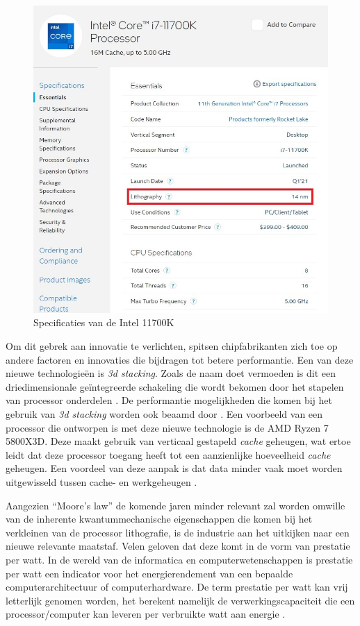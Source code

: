\begin{figure}[!htb]
    \centering
    \includegraphics[width=\linewidth]{img/11700k.jpg}
    \caption{Specificaties van de Intel 11700K \autocite{Intel2021}}
\end{figure}

Om dit gebrek aan innovatie te verlichten, spitsen chipfabrikanten zich toe op andere 
factoren en innovaties die bijdragen tot betere performantie. Een van deze nieuwe technologieën is \textit{3d stacking}. Zoals de naam doet vermoeden is dit een driedimensionale geïntegreerde schakeling die wordt bekomen door het stapelen van processor onderdelen \autocite{DeBenedictis2017}. De performantie mogelijkheden die komen bij het gebruik van \textit{3d stacking} worden ook beaamd door \textcite{Aitken2019}. Een voorbeeld van een processor die ontworpen is met deze nieuwe technologie is de AMD Ryzen 7 5800X3D. Deze maakt gebruik van verticaal gestapeld \textit{cache} geheugen, wat ertoe leidt dat deze processor toegang heeft tot een aanzienlijke hoeveelheid \textit{cache} geheugen. Een voordeel van deze aanpak is dat data minder vaak moet worden uitgewisseld tussen cache- en werkgeheugen \autocite{AMD2022}.

Aangezien “Moore’s law” de komende jaren minder relevant zal worden omwille van de inherente kwantummechanische eigenschappen die komen bij het verkleinen van de processor lithografie, is de industrie aan het uitkijken naar een nieuwe relevante maatstaf. Velen geloven dat deze komt in de vorm van prestatie per watt. In de wereld van de informatica en computerwetenschappen is prestatie per watt een indicator voor het energierendement van een bepaalde computerarchitectuur of computerhardware. De term prestatie per watt kan vrij letterlijk genomen worden, het berekent namelijk de verwerkingscapaciteit die een processor/computer kan leveren per verbruikte watt aan energie \autocite{Audiopedia2017}.

